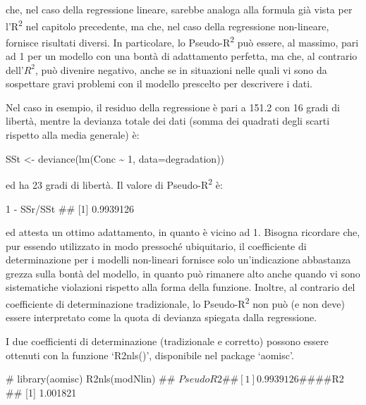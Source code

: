 \documentclass[a4paper,12pt,oneside]{book}
\newenvironment{Shaded}{\begin{snugshade}}{\end{snugshade}}
\newcommand{\DecValTok}[1]{#1}
\newcommand{\SpecialCharTok}[1]{#1}
\newcommand{\CommentTok}[1]{#1}
\newcommand{\DocumentationTok}[1]{#1}
\newcommand{\OtherTok}[1]{#1}
\newcommand{\FunctionTok}[1]{#1}
\newcommand{\AttributeTok}[1]{#1}
\newcommand{\NormalTok}[1]{#1}
\begin{document}
che, nel caso della regressione lineare, sarebbe analoga alla formula già vista per l'R\textsuperscript{2} nel capitolo precedente, ma che, nel caso della regressione non-lineare, fornisce risultati diversi. In particolare, lo Pseudo-R\textsuperscript{2} può essere, al massimo, pari ad 1 per un modello con una bontà di adattamento perfetta, ma che, al contrario dell'\(R^2\), può divenire negativo, anche se in situazioni nelle quali vi sono da sospettare gravi problemi con il modello prescelto per descrivere i dati.

Nel caso in esempio, il residuo della regressione è pari a 151.2 con 16 gradi di libertà, mentre la devianza totale dei dati (somma dei quadrati degli scarti rispetto alla media generale) è:

\begin{Shaded}
\begin{Highlighting}[]
\NormalTok{SSt }\OtherTok{\textless{}{-}} \FunctionTok{deviance}\NormalTok{(}\FunctionTok{lm}\NormalTok{(Conc }\SpecialCharTok{\textasciitilde{}} \DecValTok{1}\NormalTok{, }\AttributeTok{data=}\NormalTok{degradation))}
\end{Highlighting}
\end{Shaded}

ed ha 23 gradi di libertà. Il valore di Pseudo-R\textsuperscript{2} è:

\begin{Shaded}
\begin{Highlighting}[]
\DecValTok{1} \SpecialCharTok{{-}}\NormalTok{ SSr}\SpecialCharTok{/}\NormalTok{SSt}
\DocumentationTok{\#\# [1] 0.9939126}
\end{Highlighting}
\end{Shaded}

ed attesta un ottimo adattamento, in quanto è vicino ad 1. Bisogna ricordare che, pur essendo utilizzato in modo pressoché ubiquitario, il coefficiente di determinazione per i modelli non-lineari fornisce solo un'indicazione abbastanza grezza sulla bontà del modello, in quanto può rimanere alto anche quando vi sono sistematiche violazioni rispetto alla forma della funzione. Inoltre, al contrario del coefficiente di determinazione tradizionale, lo Pseudo-R\textsuperscript{2} non può (e non deve) essere interpretato come la quota di devianza spiegata dalla regressione.

I due coefficienti di determinazione (tradizionale e corretto) possono essere ottenuti con la funzione `R2nls()', disponibile nel package `aomisc'.

\begin{Shaded}
\begin{Highlighting}[]
\CommentTok{\# library(aomisc)}
\FunctionTok{R2nls}\NormalTok{(modNlin)}
\DocumentationTok{\#\# $PseudoR2}
\DocumentationTok{\#\# [1] 0.9939126}
\DocumentationTok{\#\# }
\DocumentationTok{\#\# $R2}
\DocumentationTok{\#\# [1] 1.001821}
\end{Highlighting}
\end{Shaded}
\end{document}
